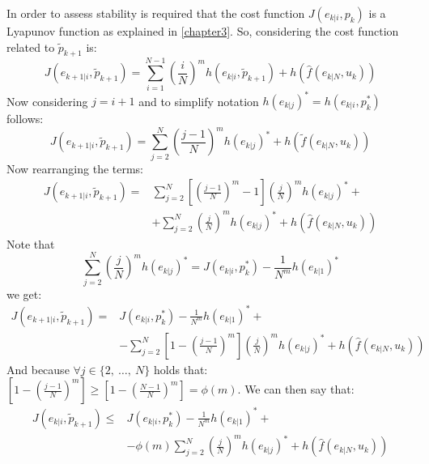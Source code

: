 
In order to assess stability is required that the cost function $J({e}_{k|i},{p}_k)$ is a Lyapunov function as explained in \ref{chapter3}. So, considering the cost function related to $\tilde{p}_{k+1}$ is:
\begin{equation*}
    J({e}_{k+1|i},\tilde{p}_{k+1})=\sum_{i=1}^{N-1}\left(\frac{i}{N}\right)^m h({e}_{k|i},\tilde{p}_{k+1})+h(\hat{f}(e_{k|N},u_k))
\end{equation*}
Now considering $j=i+1$ and to simplify notation $h(e_{k|j})^*=h({e}_{k|i},p_{k}^*)$ follows: 
\begin{equation*}
    J({e}_{k+1|i},\tilde{p}_{k+1})=\sum_{j=2}^{N}\left(\frac{j-1}{N}\right)^m h(e_{k|j})^*+h(\tilde{f}(e_{k|N},u_k))
\end{equation*}
Now rearranging the terms: 
\begin{equation*}
    \begin{split}
        J({e}_{k+1|i},\tilde{p}_{k+1})=&\sum_{j=2}^{N}\left[\left(\frac{j-1}{N}\right)^m-1\right]\left(\frac{j}{N}\right)^m h(e_{k|j})^*+ \\
        &+\sum_{j=2}^{N}\left(\frac{j}{N}\right)^m h(e_{k|j})^* + h(\hat{f}(e_{k|N},u_k))
    \end{split}
\end{equation*}
Note that 
\begin{equation*}
	\sum_{j=2}^{N}\left(\frac{j}{N}\right)^m h(e_{k|j})^*=J({e}_{k|i},p_{k}^*)-\frac{1}{N^m}h(e_{k|1})^*
\end{equation*}
we get:
\begin{equation*}
    \begin{split}
        J({e}_{k+1|i},\tilde{p}_{k+1})=&J({e}_{k|i},p_{k}^*)-\frac{1}{N^m}h(e_{k|1})^*+ \\ 
        &-\sum_{j=2}^{N}\left[1-\left(\frac{j-1}{N}\right)^m\right]\left(\frac{j}{N}\right)^m h(e_{k|j})^*+ h(\hat{f}(e_{k|N},u_k))
    \end{split}
\end{equation*}
And because $\forall j \in \lbrace2,\ \dots,\ N\rbrace$ holds that: 
$\left[ 1-\left(\frac{j-1}{N}\right)^m \right]\ge\left[ 1-\left(\frac{N-1}{N}\right)^m \right]= \phi(m)$. We can then say that: 
\begin{equation}\label{dim1}
    \begin{split}
        J({e}_{k|i},\tilde{p}_{k+1})\le &J({e}_{k|i},p_{k}^*) - \frac{1}{N^m}h(e_{k|1})^*+ \\ 
        &-\phi(m)\sum_{j=2}^{N}\left(\frac{j}{N}\right)^m h(e_{k|j})^*+ h(\hat{f}(e_{k|N},u_k))
    \end{split}
\end{equation}

